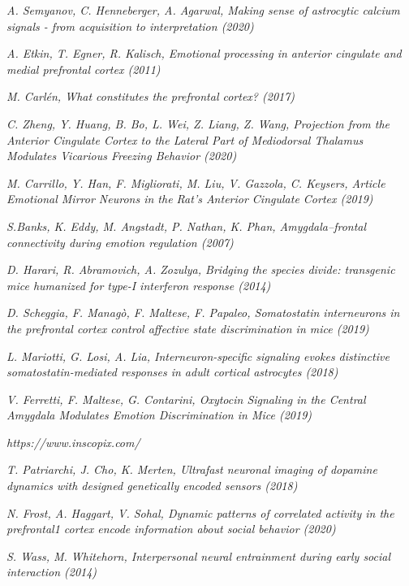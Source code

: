 \documentclass[12pt, a4paper]{report}
\begin{document}
\begin{thebibliography}{50}
	\textit{A. Semyanov, C. Henneberger, A. Agarwal, Making sense of astrocytic calcium signals - from acquisition to interpretation (2020)}
	
	\textit{A. Etkin, T. Egner, R. Kalisch, Emotional processing in anterior
		cingulate and medial prefrontal cortex (2011)}
	
	\textit{M. Carlén, What constitutes the prefrontal cortex?  (2017)}
	
	\textit{C. Zheng, Y. Huang, B. Bo, L. Wei, Z. Liang, Z. Wang, Projection from the Anterior Cingulate Cortex to the Lateral Part of Mediodorsal Thalamus Modulates Vicarious Freezing Behavior  (2020)}
	
	\textit{M. Carrillo, Y. Han,
		F. Migliorati, M. Liu,
		V. Gazzola, C. Keysers, Article
		Emotional Mirror Neurons in the Rat’s Anterior
		Cingulate Cortex (2019)}
	
	\textit{S.Banks, K. Eddy, M. Angstadt, P. Nathan, K. Phan, Amygdala–frontal connectivity during emotion regulation (2007)}
	
	\textit{D. Harari, R. Abramovich, A. Zozulya, Bridging the species divide: transgenic mice humanized for type-I interferon response  (2014)}
	
	\textit{D. Scheggia, F. Managò, F. Maltese, F. Papaleo, Somatostatin interneurons in the prefrontal cortex
		control affective state discrimination in mice (2019)}
	
	\textit{L. Mariotti, G. Losi, A. Lia, Interneuron-specific signaling evokes distinctive
		somatostatin-mediated responses in adult cortical
		astrocytes (2018)}
	
	\textit{V. Ferretti, F. Maltese,
		G. Contarini, Oxytocin Signaling in the Central Amygdala
		Modulates Emotion Discrimination in Mice (2019)}
	
	\textit{https://www.inscopix.com/}
	
	\textit{T. Patriarchi, J. Cho, K. Merten, Ultrafast neuronal imaging of dopamine dynamics with designed genetically encoded sensors (2018)}
	
	\textit{
		N. Frost, A. Haggart, V. Sohal,
		Dynamic patterns of correlated activity in the prefrontal1
		cortex encode information about social behavior (2020)}
	
	\textit{S. Wass, M. Whitehorn,  Interpersonal neural entrainment during
		early social interaction (2014)}
	

\end{thebibliography}
\end{document}

